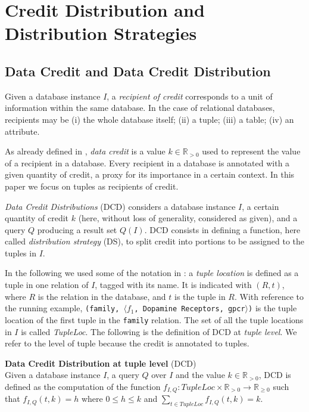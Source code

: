 \section{Credit Distribution and Distribution Strategies}
\label{section:distribution_strategies}

\subsection{Data Credit and Data Credit Distribution}
Given a database instance $I$, a \emph{recipient of credit} corresponds to a unit of information within the same database. In the case of relational databases, recipients may be (i) the whole database itself; (ii) a tuple; (iii) a table; (iv) an attribute.

As already defined in \citep{dosso2020data}, \emph{data credit} is a value $k \in \mathbb{R}_{>0}$ used to represent the value of a recipient in a database. 
Every recipient in a database is annotated with a given quantity of credit, a proxy for its importance in a certain context. In this paper we focus on tuples as recipients of credit. 

\emph{Data Credit Distributions} (DCD) considers a database instance $I$, a certain quantity of credit $k$ (here, without loss of generality, considered as given), and a query $Q$ producing a result set $Q(I)$.  
DCD consists in defining a function, here called \emph{distribution strategy} (DS), to split credit into portions to be assigned to the tuples in $I$.

In the following we used some of the notation in \citep{CheneyProvSurvey}: a \emph{tuple location} is defined as a tuple in one relation of $I$, tagged with its name. It is indicated with $(R, t)$, where $R$ is the relation in the database, and $t$ is the tuple in $R$. With reference to the running example, \texttt{(family, $\langle f_1$, Dopamine Receptors, gpcr$\rangle$)} is the tuple location of the first tuple in the \texttt{family} relation.  The set of all the tuple locations in $I$ is called \emph{TupleLoc}.
The following is the definition of DCD at \emph{tuple level}. We refer to the level of tuple because the credit is annotated to tuples.

\begin{definition}
    \textbf{Data Credit Distribution at tuple level} (DCD)~\citep{dosso2020data}
    \label{def:CDT}\\
    Given a database instance $I$, a query $Q$ over $I$ and the value $k \in \mathbb{R}_{>0}$, DCD is defined as the computation of the function $f_{I, Q} : TupleLoc \times \mathbb{R}_{> 0} \rightarrow \mathbb{R}_{\geq0}$ such that $f_{I,Q}(t, k)=h$ where $0 \leq h \leq k$ and $\sum_{t \in TupleLoc}f_{I, Q}(t, k) = k$.
\end{definition}

